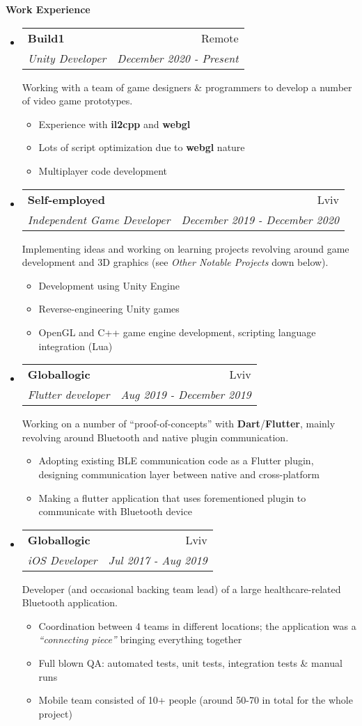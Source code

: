 \documentclass[letterpaper,11pt]{article}
\makeatletter
\newcommand{\resitem}[1]{\item #1 \vspace{-2pt}}
\newcommand{\resheading}[1]{{\large \colorbox{mygrey}{\begin{minipage}{\textwidth}{\textbf{#1 \vphantom{p\^{E}}}}\end{minipage}}}}
\newcommand{\ressubheading}[4]{
\begin{tabular*}{7.1in}{l@{\extracolsep{\fill}}r}
		\textbf{#1} & #2 \\
		\textit{#3} & \textit{#4} \\
\end{tabular*}\vspace{-6pt}}
\makeatother
\begin{document}
\resheading{Work Experience}
\begin{itemize}
	\item
		\ressubheading{Build1}{Remote}{Unity Developer}{December 2020 - Present}

		Working with a team of game designers \& programmers to develop a number of video game prototypes.
		\begin{itemize}
			\resitem{Experience with \textbf{il2cpp} and \textbf{webgl}}
			\resitem{Lots of script optimization due to \textbf{webgl} nature}
			\resitem{Multiplayer code development}
		\end{itemize}

	\item
		\ressubheading{Self-employed}{Lviv}{Independent Game Developer}{December 2019 - December 2020}

		Implementing ideas and working on learning projects revolving around game development and 3D graphics (see \textit{Other Notable Projects} down below).
		\begin{itemize}
				\resitem{Development using Unity Engine}
				\resitem{Reverse-engineering Unity games}
				\resitem{OpenGL and C++ game engine development, scripting language integration (Lua)}
		\end{itemize}

	\item
		\ressubheading{Globallogic}{Lviv}{Flutter developer}{Aug 2019 - December 2019}
		
		Working on a number of ``proof-of-concepts'' with \textbf{Dart}/\textbf{Flutter}, mainly revolving around Bluetooth and native plugin communication.
		\begin{itemize}
				\resitem{Adopting existing BLE communication code as a Flutter plugin, designing communication layer between native and cross-platform}
				\resitem{Making a flutter application that uses forementioned plugin to communicate with Bluetooth device}
		\end{itemize}

	\item
		\ressubheading{Globallogic}{Lviv}{iOS Developer}{Jul 2017 - Aug 2019}

		Developer (and occasional backing team lead) of a large healthcare-related Bluetooth application.
		\begin{itemize}
				\resitem{Coordination between 4 teams in different locations; the application was a \textit{``connecting piece''} bringing everything together}
				\resitem{Full blown QA: automated tests, unit tests, integration tests \& manual runs}
				\resitem{Mobile team consisted of 10+ people (around 50-70 in total for the whole project)}
		\end{itemize}


\end{itemize}
\end{document}
